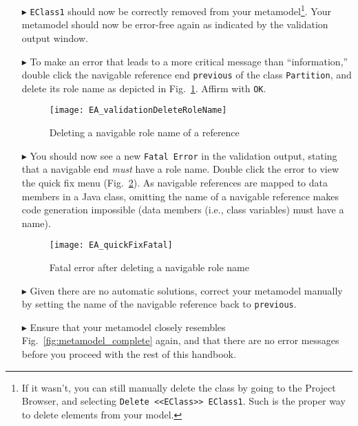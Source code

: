 \begin{enumerate}
\item[$\blacktriangleright$] \texttt{EClass1} should now be correctly removed from your metamodel\footnote{If it wasn't, you can still manually delete the
class by going to the Project Browser, and selecting \texttt{Delete <<EClass>> EClass1}. Such is the proper way to delete elements from your model.}. Your
metamodel should now be error-free again as indicated by the validation output window.

\item[$\blacktriangleright$] To make an error that leads to a more critical message than ``information,'' double click the navigable reference end
\texttt{previous} of the class \texttt{Partition}, and delete its role name as depicted in Fig.~\ref{fig:delete-role-name}. Affirm with \texttt{OK}.

\begin{figure}[htbp]
    \centering
  \texttt{[image: EA\_validationDeleteRoleName]}
    \caption{Deleting a navigable role name of a reference}
    \label{fig:delete-role-name}
\end{figure}

\item[$\blacktriangleright$] You should now see a new \texttt{Fatal Error} in the validation output, stating that a navigable end \emph{must} have a role name.
Double click the error to view the quick fix menu (Fig.~\ref{fig:fatal-error}). As navigable references are mapped to data members in a Java class, omitting the
name of a navigable reference makes code generation impossible (data members (i.e., class variables) must have a name).

\begin{figure}[htbp]
	\centering
  \texttt{[image: EA\_quickFixFatal]}
	\caption{Fatal error after deleting a navigable role name}
	\label{fig:fatal-error}
\end{figure}

\item[$\blacktriangleright$] Given there are no automatic solutions, correct your metamodel manually by setting the name of the navigable reference back to
\texttt{previous}.

\item[$\blacktriangleright$] Ensure that your metamodel closely resembles Fig.~\ref{fig:metamodel_complete} again, and that there are no error messages before
you proceed with the rest of this handbook.
\end{enumerate}

